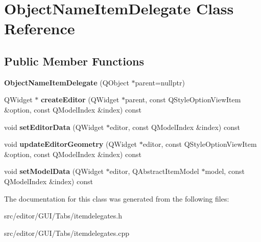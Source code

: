 \hypertarget{class_object_name_item_delegate}{\section{\-Object\-Name\-Item\-Delegate \-Class \-Reference}
\label{class_object_name_item_delegate}
}
\subsection*{\-Public \-Member \-Functions}
\begin{DoxyCompactItemize}
\item 
\hypertarget{class_object_name_item_delegate_a29ea6448c3b0db37a948cfb7802ce6b5}{{\bfseries \-Object\-Name\-Item\-Delegate} (\-Q\-Object $\ast$parent=nullptr)}\label{class_object_name_item_delegate_a29ea6448c3b0db37a948cfb7802ce6b5}

\item 
\hypertarget{class_object_name_item_delegate_a3e4e9d436c524a21953e61e0fcb9b798}{\-Q\-Widget $\ast$ {\bfseries create\-Editor} (\-Q\-Widget $\ast$parent, const \-Q\-Style\-Option\-View\-Item \&option, const \-Q\-Model\-Index \&index) const }\label{class_object_name_item_delegate_a3e4e9d436c524a21953e61e0fcb9b798}

\item 
\hypertarget{class_object_name_item_delegate_a97d0e306dd9de35e4db9074144b754e1}{void {\bfseries set\-Editor\-Data} (\-Q\-Widget $\ast$editor, const \-Q\-Model\-Index \&index) const }\label{class_object_name_item_delegate_a97d0e306dd9de35e4db9074144b754e1}

\item 
\hypertarget{class_object_name_item_delegate_a19c1f716cc9ae25eb428e2a8a976f6da}{void {\bfseries update\-Editor\-Geometry} (\-Q\-Widget $\ast$editor, const \-Q\-Style\-Option\-View\-Item \&option, const \-Q\-Model\-Index \&index) const }\label{class_object_name_item_delegate_a19c1f716cc9ae25eb428e2a8a976f6da}

\item 
\hypertarget{class_object_name_item_delegate_ad76b23ca6c74ba9888f1bf0fcc5129be}{void {\bfseries set\-Model\-Data} (\-Q\-Widget $\ast$editor, \-Q\-Abstract\-Item\-Model $\ast$model, const \-Q\-Model\-Index \&index) const }\label{class_object_name_item_delegate_ad76b23ca6c74ba9888f1bf0fcc5129be}

\end{DoxyCompactItemize}


\-The documentation for this class was generated from the following files\-:\begin{DoxyCompactItemize}
\item 
src/editor/\-G\-U\-I/\-Tabs/itemdelegates.\-h\item 
src/editor/\-G\-U\-I/\-Tabs/itemdelegates.\-cpp\end{DoxyCompactItemize}
